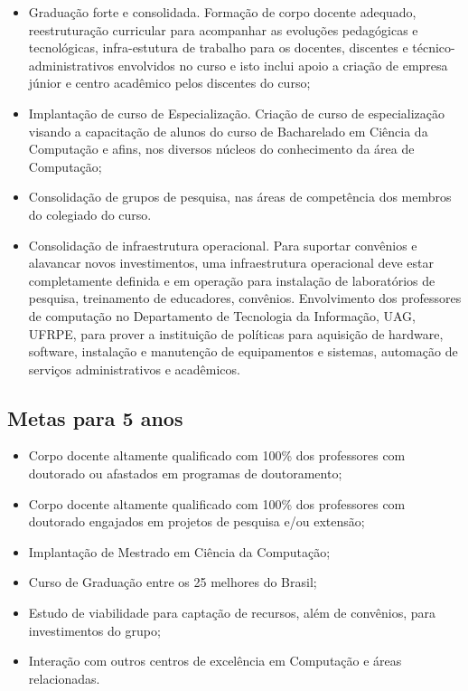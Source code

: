 \documentclass[
	12pt,				%
	openright,			%
  oneside,     %
	a4paper,			%
	english,			%
	french,				%
	spanish,			%
	brazil				%
	]{abntex2}
\begin{document}
\begin{itemize}
  \item Graduação forte e consolidada. Formação de corpo docente adequado,
reestruturação curricular para acompanhar as evoluções pedagógicas e 
tecnológicas, infra-estutura de trabalho para os docentes, discentes e 
técnico-administrativos envolvidos no curso e isto inclui apoio a criação de
 empresa júnior e centro acadêmico pelos discentes do curso;
  \item Implantação de curso de Especialização. Criação de curso de
especialização visando a capacitação  de  alunos do curso de  Bacharelado em Ciência da Computação e afins, nos diversos núcleos do conhecimento da área de Computação;
  \item Consolidação de grupos de pesquisa, nas áreas de competência dos membros do colegiado do curso.
  \item Consolidação de infraestrutura operacional. Para suportar convênios e
alavancar novos   investimentos, uma infraestrutura operacional deve estar completamente
definida  e em operação para instalação de laboratórios de pesquisa, treinamento
de educadores,  convênios. Envolvimento dos professores de computação no
Departamento de Tecnologia da Informação, UAG, UFRPE, para  prover a instituição
de políticas para aquisição de hardware, software, instalação  e manutenção de equipamentos e sistemas, automação de
serviços administrativos e acadêmicos.
\end{itemize}

\subsection*{Metas para 5 anos}

\begin{itemize}
  \item Corpo docente altamente qualificado com 100\% dos professores com
doutorado ou afastados em programas de doutoramento;
  \item Corpo docente altamente qualificado com 100\% dos professores com
doutorado engajados em projetos de pesquisa e/ou extensão;
  \item Implantação de Mestrado em Ciência da Computação;
  \item Curso de Graduação entre os 25 melhores do Brasil;
  \item Estudo de viabilidade para captação de recursos, além de convênios, para
investimentos do grupo;
  \item Interação com outros centros de excelência em Computação e áreas relacionadas.
\end{itemize}
\end{document}
